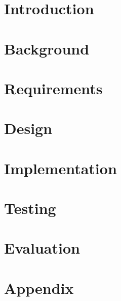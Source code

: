 \documentclass[a4paper]{report}
\begin{document}

\chapter{Introduction}


\chapter{Background}


\chapter{Requirements}


\chapter{Design}


\chapter{Implementation}


\chapter{Testing}


\chapter{Evaluation}


\appendix
\chapter{Appendix}


\renewcommand\bibname{References}
\printbibliography{}
\end{document}

